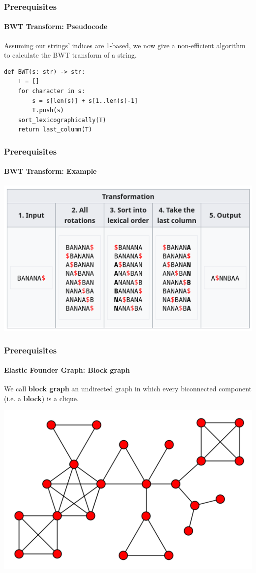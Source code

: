 \begin{frame}[fragile]
	\frametitle{Prerequisites}
	\framesubtitle{BWT Transform: Pseudocode}
	Assuming our strings' indices are 1-based, we now give a non-efficient algorithm to calculate
	the BWT transform of a string.
	\begin{verbatim}
def BWT(s: str) -> str:
	T = []
	for character in s:
		s = s[len(s)] + s[1..len(s)-1]
		T.push(s)
	sort_lexicographically(T)
	return last_column(T)
	\end{verbatim}
\end{frame}

\begin{frame}
	\frametitle{Prerequisites}
	\framesubtitle{BWT Transform: Example}
	\includegraphics[scale=0.56]{images/bwt-example.png}
\end{frame}

\begin{frame}
	\frametitle{Prerequisites}
	\framesubtitle{Elastic Founder Graph: Block graph}
	\begin{definition}
		We call \textbf{block graph} an undirected graph in which every biconnected
		component (i.e. a \textbf{block}) is a clique.
	\end{definition}
	\begin{center}
		\includegraphics[scale=0.09]{images/block_graph.png}		
	\end{center}
\end{frame}

